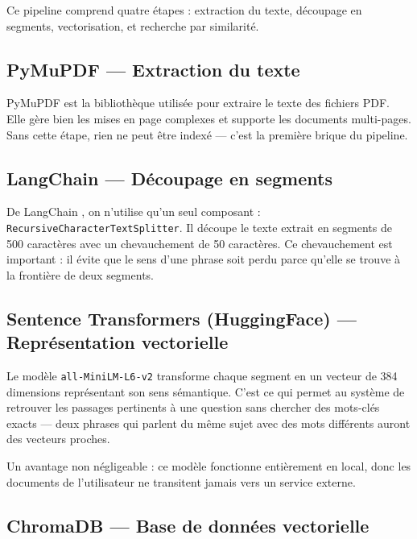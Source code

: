 Ce pipeline comprend quatre étapes : extraction du texte, découpage en segments, vectorisation, et recherche par similarité.

\subsection{PyMuPDF — Extraction du texte}

PyMuPDF \cite{pymupdf} est la bibliothèque utilisée pour extraire le texte des fichiers PDF. Elle gère bien les mises en page complexes et supporte les documents multi-pages. Sans cette étape, rien ne peut être indexé — c'est la première brique du pipeline.

\subsection{LangChain — Découpage en segments}

De LangChain \cite{langchain}, on n'utilise qu'un seul composant : \texttt{RecursiveCharacterTextSplitter}. Il découpe le texte extrait en segments de 500 caractères avec un chevauchement de 50 caractères. Ce chevauchement est important : il évite que le sens d'une phrase soit perdu parce qu'elle se trouve à la frontière de deux segments.

\subsection{Sentence Transformers (HuggingFace) — Représentation vectorielle}

Le modèle \texttt{all-MiniLM-L6-v2} \cite{sentencetransformers} transforme chaque segment en un vecteur de 384 dimensions représentant son sens sémantique. C'est ce qui permet au système de retrouver les passages pertinents à une question sans chercher des mots-clés exacts — deux phrases qui parlent du même sujet avec des mots différents auront des vecteurs proches.

Un avantage non négligeable : ce modèle fonctionne entièrement en local, donc les documents de l'utilisateur ne transitent jamais vers un service externe.

\subsection{ChromaDB — Base de données vectorielle}

